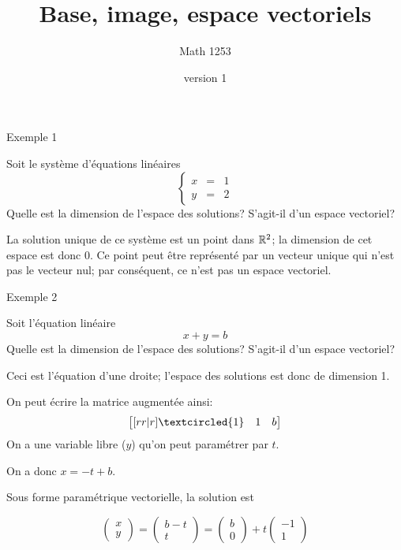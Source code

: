 \documentclass[french, handout]{beamer}
\title{Base, image, espace vectoriels}
\author{Math 1253} %
\date{version 1}   %
\begin{document}

\begin{frame}{Exemple 1}
\begin{example}
Soit le système d'équations linéaires
\[
\left\{ \begin{matrix}
x &=& 1\\
y &=& 2
\end{matrix}\right.
\]
Quelle est la dimension de l'espace des solutions?  S'agit-il d'un espace vectoriel?
\end{example}

La solution unique de ce système est un point dans $\mathbb{R}^2$;
la dimension de cet espace est donc 0.  Ce point peut être représenté par un vecteur unique
qui n'est pas le vecteur nul; par conséquent, ce n'est pas un espace vectoriel.

\end{frame}

\begin{frame}{Exemple 2}

\begin{example}
Soit l'équation linéaire
\[
x + y = b
\]
Quelle est la dimension de l'espace des solutions?  S'agit-il d'un espace vectoriel?
\end{example}


Ceci est l'équation d'une droite; l'espace des solutions est donc de dimension 1.

On peut écrire la matrice augmentée ainsi:
\[
\begin{bmatrix}[rr|r]
\textcircled{1} & 1 & b\\
\end{bmatrix}
\]
On a une variable libre ($y$) qu'on peut paramétrer par $t$.

On a donc $x = -t + b$.

Sous forme paramétrique vectorielle, la solution est

\[
\begin{pmatrix}
x \\ y
\end{pmatrix}
= \begin{pmatrix}
b-t \\
t
\end{pmatrix}
=
\begin{pmatrix}
b\\0
\end{pmatrix}
+ t\begin{pmatrix}
-1 \\ 1
\end{pmatrix}
\]

\end{frame}
\end{document}
